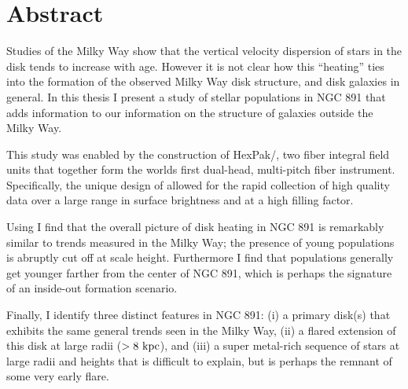 \chapter*{Abstract}

Studies of the Milky Way show that the vertical velocity dispersion of
stars in the disk tends to increase with age. However it is not clear
how this ``heating'' ties into the formation of the observed Milky Way
disk structure, and disk galaxies in general. In this thesis I present
a study of stellar populations in NGC 891 that adds information to our
information on the structure of galaxies outside the Milky Way.

This study was enabled by the construction of HexPak/\GP, two fiber
integral field units that together form the worlds first dual-head,
multi-pitch fiber instrument. Specifically, the unique design of \GP
allowed for the rapid collection of high quality data over a large
range in surface brightness and at a high filling factor. 

Using \GP I find that the overall picture of disk heating in NGC 891
is remarkably similar to trends measured in the Milky Way; the
presence of young populations is abruptly cut off at  scale
height. Furthermore I find that populations generally get younger
farther from the center of NGC 891, which is perhaps the signature of
an inside-out formation scenario.

Finally, I identify three distinct features in NGC 891: (i) a primary
disk(s) that exhibits the same general trends seen in the Milky Way,
(ii) a flared extension of this disk at large radii ($>
8~\mathrm{kpc} $), and (iii) a super metal-rich sequence of stars at
large radii and heights that is difficult to explain, but is perhaps
the remnant of some very early flare.
